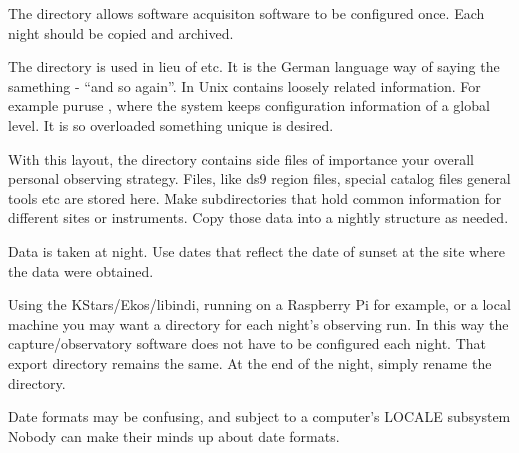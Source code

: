 \documentclass[letter,11pt,oneside]{article}
\newcommand{\dhl}[1]{{\color{verbcolor}{\texttt#1}}}
\begin{document}

The \dhl{{\textasciitilde}/Desktop} directory allows software acquisiton software to be
configured once. Each night should be copied and archived. 

\begin{quote}
\begin{figure}[h!]
\label{figure:dirlayout}
\end{figure}
\end{quote}


The directory \dhl{usw} is used in lieu of etc. It is the German language
way of saying the samething - \dhl{und so wieder} ``and so again''.
In Unix \dhl{etc} contains loosely related information. For example
puruse \dhl{/etc}, where the system keeps configuration information
of a global level. It is so overloaded something unique is desired.

With this layout, the \dhl{{\textasciitilde}/Observations/usw}
directory contains side files of importance your overall personal
observing strategy. Files, like ds9 region files, special catalog
files general tools etc are stored here. Make subdirectories that
hold common information for different sites or instruments. Copy
those data into a nightly structure as needed.

Data is taken at night. Use dates that reflect the date of sunset
at the site where the data were obtained.

Using the KStars/Ekos/libindi, running on a Raspberry Pi for example,
or a local machine you may want a \dhl{{\textasciitilde}/Desktop/Today} directory
for each night's observing run. In this way the capture/observatory
software does not have to be configured each night. That export directory
remains the same. At the end of the night, simply rename the directory.

Date formats may be confusing, and subject to a computer's LOCALE
subsystem Nobody can make their minds up about date formats.
\end{document}
